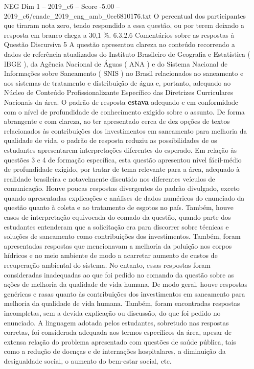 \begin{textsample}{NEG Dim 1 – 2019\_c6 – Score -5.00 – 2019\_c6/enade\_2019\_eng\_amb\_0cc6810176.txt}
O percentual dos participantes que tiraram nota zero, tendo respondido a essa questão, ou por terem deixado a resposta em branco chega a 30,1 \%. 6.3.2.6 Comentários sobre as respostas à Questão Discursiva 5 A questão apresentou clareza no conteúdo recorrendo a dados de referência atualizados do Instituto Brasileiro de Geografia e Estatística ( IBGE ), da Agência Nacional de Águas ( ANA ) e do Sistema Nacional de Informações sobre Saneamento ( SNIS ) no Brasil relacionados ao saneamento e aos sistemas de tratamento e distribuição de água e, portanto, adequado ao Núcleo de Conteúdo Profissionalizante Específico das Diretrizes Curriculares Nacionais da área.
O padrão de resposta \textbf{estava} adequado e em conformidade com o nível de profundidade de conhecimento exigido sobre o assunto.
De forma abrangente e com clareza, ao ter apresentado cerca de dez opções de textos relacionados às contribuições dos investimentos em saneamento para melhoria da qualidade de vida, o padrão de resposta reduziu as possibilidades de os estudantes apresentarem interpretações diferentes do esperado.
Em relação às questões 3 e 4 de formação específica, esta questão apresentou nível fácil-médio de profundidade exigido, por tratar de tema relevante para a área, adequado à realidade brasileira e notavelmente discutido nos diferentes veículos de comunicação.
Houve poucas respostas divergentes do padrão divulgado, exceto quando apresentadas explicações e análises de dados numéricos do enunciado da questão quanto à coleta e ao tratamento de esgotos no país.
Também, houve casos de interpretação equivocada do comado da questão, quando parte dos estudantes entenderam que a solicitação era para discorrer sobre técnicas e soluções de saneamento como contribuições dos investimentos.
Também, foram apresentadas respostas que mencionavam a melhoria da poluição nos corpos hídricos e no meio ambiente de modo a acarretar aumento de custos de recuperação ambiental do sistema.
No entanto, essas respostas foram consideradas inadequadas ao que foi pedido no comando da questão sobre as ações de melhoria da qualidade de vida humana.
De modo geral, houve respostas genéricas e rasas quanto às contribuições dos investimentos em saneamento para melhoria da qualidade de vida humana.
Também, foram encontradas respostas incompletas, sem a devida explicação ou discussão, do que foi pedido no enunciado.
A linguagem adotada pelos estudantes, sobretudo nas respostas corretas, foi considerada adequada aos termos específicos da área, apesar de extensa relação do problema apresentado com questões de saúde pública, tais como a redução de doenças e de internações hospitalares, a diminuição da desigualdade social, o aumento do bem-estar social, etc.

\end{textsample}
